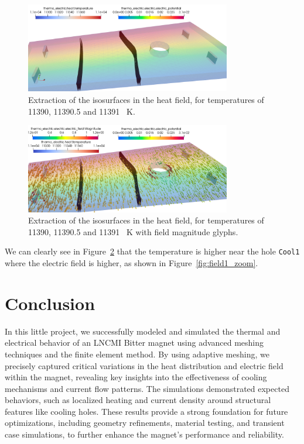 \documentclass[12pt]{article}
\begin{document}
\begin{figure}[H]
  \centering
  \includegraphics[width=0.8\textwidth]{images/isosurfaces.png}
  \caption{Extraction of the isosurfaces in the heat field, for temperatures of
  11390, 11390.5 and 11391 \SI{}{\kelvin}.}
  \label{fig:isosurfaces}
\end{figure}

\begin{figure}[H]
  \centering
  \includegraphics[width=0.8\textwidth]{images/isosurfaces_glyph.png}
  \caption{Extraction of the isosurfaces in the heat field, for temperatures of
  11390, 11390.5 and 11391 \SI{}{\kelvin} with field magnitude glyphs.}
  \label{fig:isosurfaces_glyph}
\end{figure}

We can clearly see in Figure~\ref{fig:isosurfaces_glyph} that the temperature is higher
near the hole \texttt{Cool1} where the electric field is higher, as shown in
Figure~\ref{fig:field1_zoom}.

\section{Conclusion}
In this little project, we successfully modeled and simulated the thermal and electrical
behavior of an LNCMI Bitter magnet using advanced meshing techniques and the finite
element method. By using adaptive meshing, we precisely captured critical variations
in the heat distribution and electric field within the magnet, revealing key insights
into the effectiveness of cooling mechanisms and current flow patterns. The
simulations demonstrated expected behaviors, such as localized heating and current
density around structural features like cooling holes. These results provide a
strong foundation for future optimizations, including geometry refinements, material
testing, and transient case simulations, to further enhance the magnet's performance
and reliability.
\end{document}
